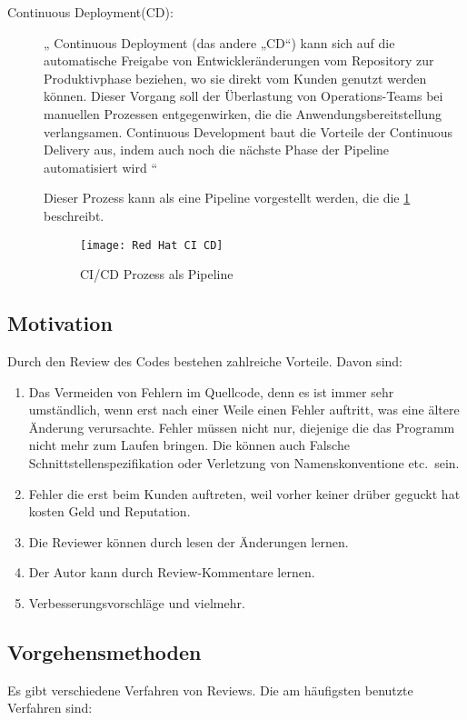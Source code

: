 \begin{description}
	\item [Continuous Deployment(CD):]
		„ Continuous Deployment (das andere „CD“) kann sich auf die automatische Freigabe von Entwickleränderungen vom Repository zur Produktivphase beziehen, wo sie direkt vom Kunden 			genutzt werden können. Dieser Vorgang soll der Überlastung von Operations-Teams bei manuellen Prozessen entgegenwirken, die die Anwendungsbereitstellung verlangsamen. Continuous 		Development baut die Vorteile der Continuous Delivery aus, indem auch noch die nächste Phase der Pipeline automatisiert wird “ \cite{RedHat}

	Dieser Prozess kann als eine Pipeline vorgestellt werden, die die \cref{fig:RedHat} beschreibt.
	\begin{figure}[H]
		\centering
		\texttt{[image: Red Hat CI CD]}
		\caption[\ac{CI}/\ac{CD}]{\ac{CI}/\ac{CD} Prozess als Pipeline\\ \cite{RedHat}}
		\label{fig:RedHat}
	\end{figure}
	
\end{description}

\subsection{Motivation}
\label{subsec:Gründe}
Durch den Review des Codes bestehen zahlreiche Vorteile. Davon sind:

\begin{enumerate}
	\item Das Vermeiden von Fehlern im Quellcode, denn es ist immer sehr umständlich, wenn erst nach einer Weile einen Fehler auftritt, was eine ältere Änderung verursachte.
		Fehler müssen nicht nur, diejenige die das Programm nicht mehr zum Laufen bringen. Die können auch Falsche Schnittstellenspezifikation oder Verletzung von Namenskonventione 
		etc.\ sein.
	\item Fehler die erst beim Kunden auftreten, weil vorher keiner drüber geguckt hat kosten Geld und Reputation.
	\item Die Reviewer können durch lesen der Änderungen lernen.
	\item Der Autor kann durch Review-Kommentare lernen.
	\item Verbesserungsvorschläge und vielmehr.
\end{enumerate}

\subsection{Vorgehensmethoden}
\label{subsec:Vorgehensmethoden}
Es gibt verschiedene Verfahren von Reviews. Die am häufigsten benutzte Verfahren sind:

